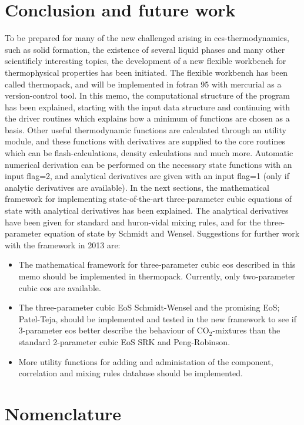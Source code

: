 \documentclass[a4paper, 12pt, english, sintefheadings, sintefcolour]{sintefmemo}
\begin{document}
\section{Conclusion and future work}
\label{sec:conclusion}
To be prepared for many of the new challenged arising in ccs-thermodynamics,
such as solid formation, the existence of several liquid phases and many other
scientificly interesting topics, the development of a new flexible workbench
for thermophysical properties has been initiated. The flexible workbench has
been called thermopack, and will be implemented in fotran 95 with mercurial as
a version-control tool. In this memo, the computational structure of the
program has been explained, starting with the input data structure and
continuing with the driver routines which explains how a minimum of functions
are chosen as a basis. Other useful thermodynamic functions are calculated
through an utility module, and these functions with derivatives are supplied
to the core routines which can be flash-calculations, density calculations and
much more.  Automatic numerical derivation can be performed on the necessary
state functions with an input flag=2, and analytical derivatives are given
with an input flag=1 (only if analytic derivatives are available). In the next
sections, the mathematical framework for implementing state-of-the-art
three-parameter cubic equations of state with analytical derivatives has been
explained. The analytical derivatives have been given for standard and
huron-vidal mixing rules, and for the three-parameter equation of state by
Schmidt and Wensel. Suggestions for further work with the framework in 2013
are:

\begin{itemize}
\item The mathematical framework for three-parameter cubic eos described in
  this memo should be implemented in thermopack. Currently, only two-parameter
  cubic eos are available.
\item The three-parameter cubic EoS Schmidt-Wensel and the promising EoS;
  Patel-Teja, should be implemented and tested in the new framework to see if
  3-parameter eos better describe the behaviour of CO$_2$-mixtures than the
  standard 2-parameter cubic EoS SRK and Peng-Robinson.
\item More utility functions for adding and administation of the component,
  correlation and mixing rules database should be implemented.
\end{itemize} 

\newpage
\section*{Nomenclature}


\clearpage


\end{document}

